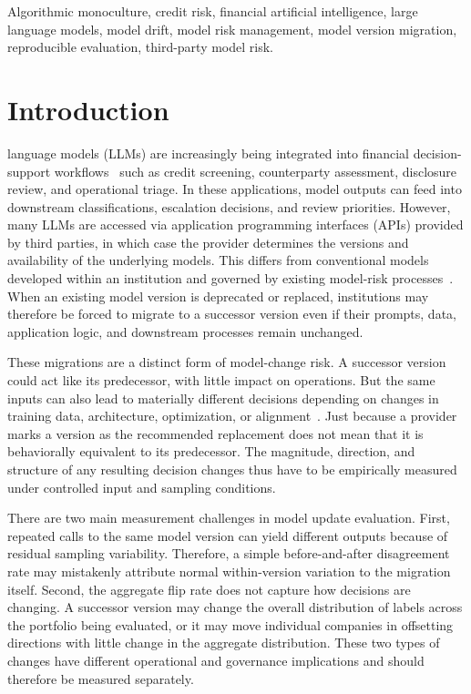 \documentclass{ieeeaccess}
\begin{document}
\begin{keywords}
Algorithmic monoculture, credit risk, financial artificial intelligence, large language models, model drift, model risk management, model version migration, reproducible evaluation, third-party model risk.
\end{keywords}

\titlepgskip=-21pt
\maketitle

\section{Introduction}
 language models (LLMs) are increasingly being integrated into financial decision-support workflows~\cite{bloomberggpt,finbert} such as credit screening, counterparty assessment, disclosure review, and operational triage. In these applications, model outputs can feed into downstream classifications, escalation decisions, and review priorities. However, many LLMs are accessed via application programming interfaces (APIs) provided by third parties, in which case the provider determines the versions and availability of the underlying models. This differs from conventional models developed within an institution and governed by existing model-risk processes~\cite{sr117,sr2602}. When an existing model version is deprecated or replaced, institutions may therefore be forced to migrate to a successor version even if their prompts, data, application logic, and downstream processes remain unchanged.

These migrations are a distinct form of model-change risk. A successor version could act like its predecessor, with little impact on operations. But the same inputs can also lead to materially different decisions depending on changes in training data, architecture, optimization, or alignment~\cite{muscle,underspec,bommasani}. Just because a provider marks a version as the recommended replacement does not mean that it is behaviorally equivalent to its predecessor. The magnitude, direction, and structure of any resulting decision changes thus have to be empirically measured under controlled input and sampling conditions.

There are two main measurement challenges in model update evaluation. First, repeated calls to the same model version can yield different outputs because of residual sampling variability. Therefore, a simple before-and-after disagreement rate may mistakenly attribute normal within-version variation to the migration itself. Second, the aggregate flip rate does not capture how decisions are changing. A successor version may change the overall distribution of labels across the portfolio being evaluated, or it may move individual companies in offsetting directions with little change in the aggregate distribution. These two types of changes have different operational and governance implications and should therefore be measured separately.
\end{document}
